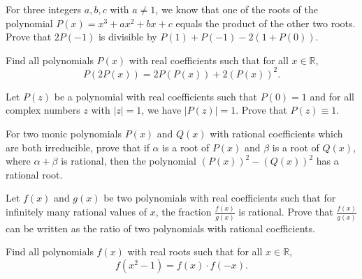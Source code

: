 \begin{question}[name={1997 Iran}]
    For three integers $a,b,c$ with $a\neq 1$, we know that one of the roots of the polynomial $P(x)=x^3+ax^2+bx+c$ equals the product of the other two roots. Prove that $2P(-1)$ is divisible by $P(1)+P(-1)-2(1+P(0))$.
\end{question}



\begin{question}[name={2001 Iran Second Round}] 
    Find all polynomials $P(x)$ with real coefficients such that for all $x\in\mathbb R$,
    \[P(2P(x)) = 2P(P(x))+2(P(x))^2.\]
\end{question}




\begin{question}[name={1997 Iran}]
    Let $P(z)$ be a polynomial with real coefficients such that $P(0)=1$ and for all complex numbers $z$ with $|z|=1$, we have $|P(z)|=1$. Prove that $P(z) \equiv 1$.
\end{question}



\begin{question}[name={1997 Iran}]
    For two monic polynomials $P(x)$ and $Q(x)$ with rational coefficients which are both irreducible, prove that if $\alpha$ is a root of $P(x)$ and $\beta$ is a root of $Q(x)$, where $\alpha+\beta$ is rational, then the polynomial $(P(x))^2 - (Q(x))^2$ has a rational root.
\end{question}


\begin{question}[name={1993 Iran Second Round}]
    Let $f(x)$ and $g(x)$ be two polynomials with real coefficients such that for infinitely many rational values of $x$, the fraction $\frac{f(x)}{g(x)}$ is rational. Prove that $\frac{f(x)}{g(x)}$ can be written as the ratio of two polynomials with rational coefficients.
\end{question}

\begin{question}[name={1994 Iran Third Round}]
    Find all polynomials $f(x)$ with real roots such that for all $x\in\mathbb R$,
    \[f(x^2-1)=f(x)\cdot f(-x).\]
\end{question}

